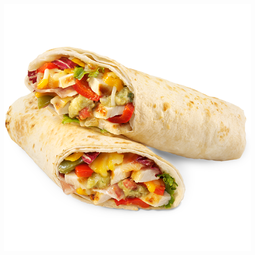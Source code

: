 \documentclass[12pt]{beamer}
\begin{document}
\begin{frame}
    \includegraphics[width=\textwidth]{burrito.png}
\end{frame}
\end{document}
